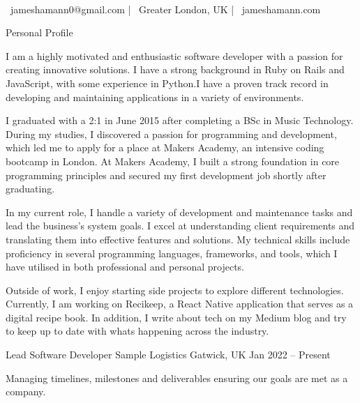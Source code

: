     
\begin{center}
	  \\
	\vspace{2mm}
	{\faEnvelope\ jameshamann0@gmail.com} | {\faMapMarker\ Greater London, UK} | {\faLink\ jameshamann.com}
\end{center}
\begin{cventries}
	\cventry
	{}
	{Personal Profile}
	{}
	{}
	{\begin{cvitems}
		\item {I am a highly motivated and enthusiastic software developer with a passion for creating innovative solutions. I have a strong background in Ruby on Rails and JavaScript, with some experience in Python.I have a proven track record in developing and maintaining applications in a variety of environments.}
		\item {I graduated with a 2:1 in June 2015 after completing a BSc in Music Technology. During my studies, I discovered a passion for programming and development, which led me to apply for a place at Makers Academy, an intensive coding bootcamp in London. At Makers Academy, I built a strong foundation in core programming principles and secured my first development job shortly after graduating.}
		\item {In my current role, I handle a variety of development and maintenance tasks and lead the business’s system goals. I excel at understanding client requirements and translating them into effective features and solutions. My technical skills include proficiency in several programming languages, frameworks, and tools, which I have utilised in both professional and personal projects.}
		\item {Outside of work, I enjoy starting side projects to explore different technologies. Currently, I am working on Recikeep, a React Native application that serves as a digital recipe book. In addition, I write about tech on my Medium blog and try to keep up to date with what\textquotesingle{}s happening across the industry.}
		\end{cvitems}}
	\cventry
	{Lead Software Developer}
	{Sample Logistics}
	{Gatwick, UK}
	{Jan 2022 – Present}
	{\begin{cvitems}
		\item {Managing timelines, milestones and deliverables ensuring our goals are met as a company.}

\end{cvitems}}
\end{cventries}

